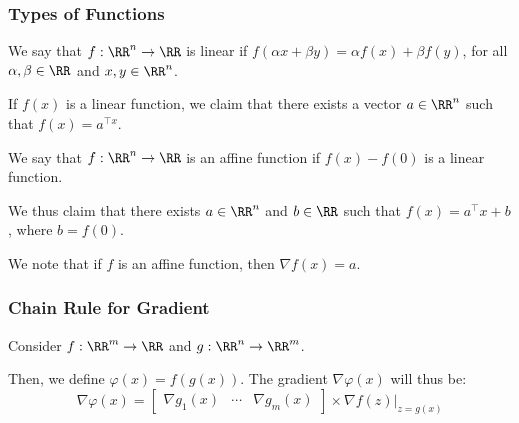 \documentclass[openany]{book}
\begin{document}
\subsubsection{Types of Functions}
\begin{defn}
	We say that $f: \RR^{n} \rightarrow \RR$ is linear if $f(\alpha x + \beta y) = \alpha f(x) + \beta f(y)$, for all $\alpha, \beta \in \RR$ and $x, y \in \RR^{n}$.
\end{defn}

\begin{prop}
	If $f(x)$ is a linear function, we claim that there exists a vector $a \in \RR^{n}$ such that $f(x) = a^{\intercal x}$.
\end{prop}

\begin{defn}
	We say that $f : \RR^{n} \rightarrow \RR$ is an affine function if $f(x) - f(0)$ is a linear function.
\end{defn}

\begin{prop}
	We thus claim that there exists $a \in \RR^{n}$ and $b \in \RR$ such that $f(x) = a^{\intercal} x + b$, where $b = f(0)$.
\end{prop}

\begin{prop}
	We note that if $f$ is an affine function, then $\nabla f(x) = a$.
\end{prop}

\subsubsection{Chain Rule for Gradient}
\begin{thm}
	Consider $f : \RR^{m} \rightarrow \RR$ and $g : \RR^{n} \rightarrow \RR^{m}$.
	
	Then, we define $\varphi (x) = f(g(x))$. The gradient $\nabla \varphi(x)$ will thus be:
	\begin{equation*}
		\nabla \varphi(x) = \begin{bmatrix}
			\nabla g_1(x) & \cdots & \nabla g_m(x)
		\end{bmatrix} \times \nabla f(z) \big|_{z = g(x)}
	\end{equation*}
	
\end{thm}
\end{document}
